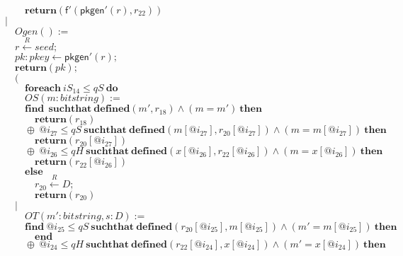 \documentclass{article}
\newcommand{\store}{\leftarrow}
\newcommand{\getR}{\stackrel{R}{\store}}
\newcommand{\kw}[1]{\mathbf{#1}}
\newcommand{\kwf}[1]{\mathsf{#1}}
\newcommand{\var}[1]{\mathit{#1}}
\newcommand{\kwt}[1]{\mathit{#1}}
\newcommand{\kwp}[1]{\mathit{#1}}
\begin{document}
\begin{tabbing}
$\quad \quad \kw{return}\kwf{}(\kwf{f'}(\kwf{pkgen'}(\var{r}), \var{r}_{22}))$\\
$|$\\
$\quad Ogen() :=$\\
$\quad \var{r} \getR \kwt{seed};$\\
$\quad \var{pk}: \kwt{pkey} \store \kwf{pkgen'}(\var{r});$\\
$\quad \kw{return}\kwf{}(\var{pk});$\\
$\quad ($\\
$\quad \quad \kw{foreach}\ \var{iS}_{14} \leq \kwp{qS}\ \kw{do}$\\
$\quad \quad OS(\var{m}: \kwt{bitstring}) :=$\\
$\quad \quad \kw{find}\ \ \kw{suchthat}\ \kw{defined}(\var{m'}, \var{r}_{18})\wedge (\var{m}  =  \var{m'})\ \kw{then}$\\
$\quad \quad \quad \kw{return}\kwf{}(\var{r}_{18})$\\
$\quad \quad \oplus\ \var{@i}_{27} \leq \kwp{qS}\ \kw{suchthat}\ \kw{defined}(\var{m}[\var{@i}_{27}], \var{r}_{20}[\var{@i}_{27}])\wedge (\var{m}  =  \var{m}[\var{@i}_{27}])\ \kw{then}$\\
$\quad \quad \quad \kw{return}\kwf{}(\var{r}_{20}[\var{@i}_{27}])$\\
$\quad \quad \oplus\ \var{@i}_{26} \leq \kwp{qH}\ \kw{suchthat}\ \kw{defined}(\var{x}[\var{@i}_{26}], \var{r}_{22}[\var{@i}_{26}])\wedge (\var{m}  =  \var{x}[\var{@i}_{26}])\ \kw{then}$\\
$\quad \quad \quad \kw{return}\kwf{}(\var{r}_{22}[\var{@i}_{26}])$\\
$\quad \quad \kw{else}$\\
$\quad \quad \quad \var{r}_{20} \getR \kwt{D};$\\
$\quad \quad \quad \kw{return}\kwf{}(\var{r}_{20})$\\
$\quad |$\\
$\quad \quad OT(\var{m'}: \kwt{bitstring}, \var{s}: \kwt{D}) :=$\\
$\quad \quad \kw{find}\ \var{@i}_{25} \leq \kwp{qS}\ \kw{suchthat}\ \kw{defined}(\var{r}_{20}[\var{@i}_{25}], \var{m}[\var{@i}_{25}])\wedge (\var{m'}  =  \var{m}[\var{@i}_{25}])\ \kw{then}$\\
$\quad \quad \quad \kw{end}$\\
$\quad \quad \oplus\ \var{@i}_{24} \leq \kwp{qH}\ \kw{suchthat}\ \kw{defined}(\var{r}_{22}[\var{@i}_{24}], \var{x}[\var{@i}_{24}])\wedge (\var{m'}  =  \var{x}[\var{@i}_{24}])\ \kw{then}$\\

\end{tabbing}
\end{document}
